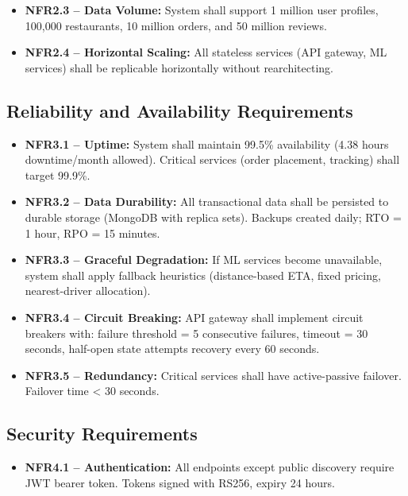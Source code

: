 \documentclass[12pt,a4paper]{report}
\begin{document}
\begin{itemize}
\begin{itemize}
    \item \textbf{NFR2.3 -- Data Volume:} System shall support 1 million user profiles, 100,000 restaurants, 10 million orders, and 50 million reviews.
    
    \item \textbf{NFR2.4 -- Horizontal Scaling:} All stateless services (API gateway, ML services) shall be replicable horizontally without rearchitecting.
\end{itemize}

\subsection{Reliability and Availability Requirements}

\begin{itemize}
    \item \textbf{NFR3.1 -- Uptime:} System shall maintain 99.5\% availability (4.38 hours downtime/month allowed). Critical services (order placement, tracking) shall target 99.9\%.
    
    \item \textbf{NFR3.2 -- Data Durability:}  All transactional data shall be persisted to durable storage (MongoDB with replica sets). Backups created daily; RTO = 1 hour, RPO = 15 minutes.
    
    \item \textbf{NFR3.3 -- Graceful Degradation:} If ML services become unavailable, system shall apply fallback heuristics (distance-based ETA, fixed pricing, nearest-driver allocation).
    
    \item \textbf{NFR3.4 -- Circuit Breaking:} API gateway shall implement circuit breakers with: failure threshold = 5 consecutive failures, timeout = 30 seconds, half-open state attempts recovery every 60 seconds.
    
    \item \textbf{NFR3.5 -- Redundancy:} Critical services shall have active-passive failover. Failover time < 30 seconds.
\end{itemize}

\subsection{Security Requirements}

\begin{itemize}
    \item \textbf{NFR4.1 -- Authentication:} All endpoints except public discovery require JWT bearer token. Tokens signed with RS256, expiry 24 hours.
    

\end{itemize}
\end{itemize}
\end{document}
